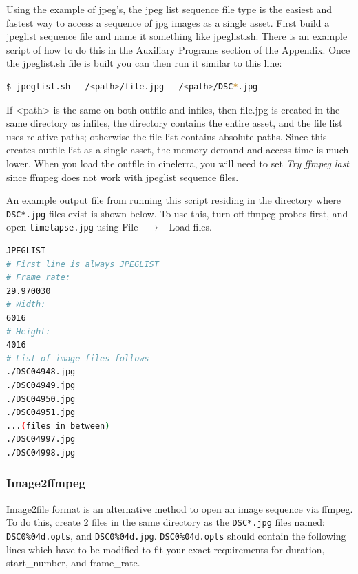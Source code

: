 Using the example of jpeg’s, the jpeg list sequence file type is the easiest and fastest way to access a sequence of jpg images as a single asset.  First build a jpeglist sequence file and name it something like jpeglist.sh.  There is an example script of how to do this in the Auxiliary Programs section of the Appendix.  Once the jpeglist.sh file is built you can then run it similar to this line:

\begin{lstlisting}[language=bash]
$ jpeglist.sh   /<path>/file.jpg   /<path>/DSC*.jpg
\end{lstlisting}

\vspace*{1ex} \noindent If <path> is the same on both outfile and infiles, then file.jpg is created in the same directory as infiles, the directory contains the entire asset, and the file list uses relative paths; otherwise the file list contains absolute paths.   Since this creates outfile list as a single asset, the memory demand and access time is much lower.  When you load the outfile in cinelerra, you will need to set \textit{Try ffmpeg last} since ffmpeg does not work with jpeglist sequence files.

An example output file from running this script residing in the directory where \texttt{DSC*.jpg} files exist is shown below.   To use this, turn off ffmpeg probes first, and open \texttt{timelapse.jpg} using File ~$\rightarrow$ ~Load files.

\begin{lstlisting}[language=bash,caption={Example: timelapse.jpg},captionpos=t]
JPEGLIST
# First line is always JPEGLIST
# Frame rate:
29.970030
# Width:
6016
# Height:
4016
# List of image files follows
./DSC04948.jpg
./DSC04949.jpg
./DSC04950.jpg
./DSC04951.jpg
...(files in between)
./DSC04997.jpg
./DSC04998.jpg
\end{lstlisting}

\subsubsection{Image2ffmpeg}%
\label{ssub:image2ffmpeg}

Image2file format is an alternative method to open an image sequence via ffmpeg.  To do this, create 2 files in the same directory as the \texttt{DSC*.jpg} files named:  \texttt{DSC0\%04d.opts}, and \texttt{DSC0\%04d.jpg}. 
\texttt{DSC0\%04d.opts} should contain the following lines which have to be modified to fit your exact requirements for duration, start\_number, and frame\_rate.


